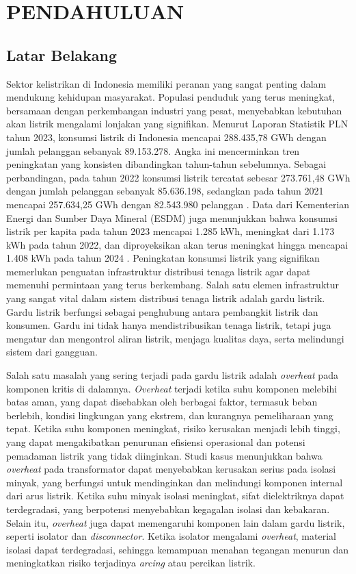 \chapter{PENDAHULUAN}
\label{chap:pendahuluan}

\section{Latar Belakang}
\sloppy
Sektor kelistrikan di Indonesia memiliki peranan yang sangat penting dalam mendukung kehidupan masyarakat. Populasi penduduk yang terus meningkat, bersamaan dengan perkembangan industri yang pesat, menyebabkan kebutuhan akan listrik mengalami lonjakan yang signifikan. Menurut Laporan Statistik PLN tahun 2023, konsumsi listrik di Indonesia mencapai 288.435,78 GWh dengan jumlah pelanggan sebanyak 89.153.278. Angka ini mencerminkan tren peningkatan yang konsisten dibandingkan tahun-tahun sebelumnya. Sebagai perbandingan, pada tahun 2022 konsumsi listrik tercatat sebesar 273.761,48 GWh dengan jumlah pelanggan sebanyak 85.636.198, sedangkan pada tahun 2021 mencapai 257.634,25 GWh dengan 82.543.980 pelanggan \cite{PLN2023}. Data dari Kementerian Energi dan Sumber Daya Mineral (ESDM) juga menunjukkan bahwa konsumsi listrik per kapita pada tahun 2023 mencapai 1.285 kWh, meningkat dari 1.173 kWh pada tahun 2022, dan diproyeksikan akan terus meningkat hingga mencapai 1.408 kWh pada tahun 2024 \cite{ESDM2024}. Peningkatan konsumsi listrik yang signifikan memerlukan penguatan infrastruktur distribusi tenaga listrik agar dapat memenuhi permintaan yang terus berkembang. Salah satu elemen infrastruktur yang sangat vital dalam sistem distribusi tenaga listrik adalah gardu listrik. Gardu listrik berfungsi sebagai penghubung antara pembangkit listrik dan konsumen. Gardu ini tidak hanya mendistribusikan tenaga listrik, tetapi juga mengatur dan mengontrol aliran listrik, menjaga kualitas daya, serta melindungi sistem dari gangguan.

Salah satu masalah yang sering terjadi pada gardu listrik adalah \emph{overheat} pada komponen kritis di dalamnya. \emph{Overheat} terjadi ketika suhu komponen melebihi batas aman, yang dapat disebabkan oleh berbagai faktor, termasuk beban berlebih, kondisi lingkungan yang ekstrem, dan kurangnya pemeliharaan yang tepat\cite{Bailey2022}. Ketika suhu komponen meningkat, risiko kerusakan menjadi lebih tinggi, yang dapat mengakibatkan penurunan efisiensi operasional dan potensi pemadaman listrik yang tidak diinginkan\cite{Aksenovich2022}. Studi kasus menunjukkan bahwa \emph{overheat} pada transformator dapat menyebabkan kerusakan serius pada isolasi minyak, yang berfungsi untuk mendinginkan dan melindungi komponen internal dari arus listrik. Ketika suhu minyak isolasi meningkat, sifat dielektriknya dapat terdegradasi, yang berpotensi menyebabkan kegagalan isolasi dan kebakaran\cite{Kalathiripi2017}. Selain itu, \emph{overheat} juga dapat memengaruhi komponen lain dalam gardu listrik, seperti isolator dan \emph{disconnector}. Ketika isolator mengalami \emph{overheat}, material isolasi dapat terdegradasi, sehingga kemampuan menahan tegangan menurun dan meningkatkan risiko terjadinya \emph{arcing} atau percikan listrik\cite{Li2017}.


